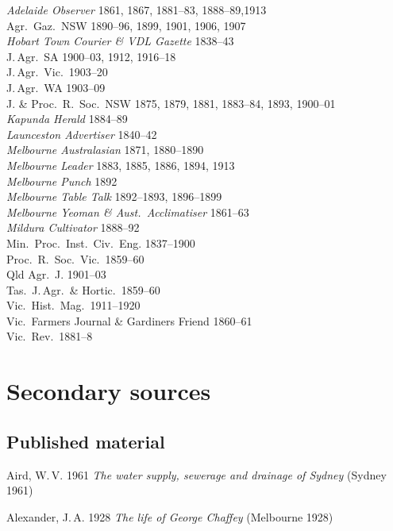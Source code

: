 \textsl{Adelaide Observer} 1861, 1867, 1881--83, 1888--89,1913\\
Agr.\ Gaz.\ NSW  1890--96, 1899, 1901, 1906, 1907\\
\textsl{Hobart Town Courier \& VDL Gazette} 1838--43\\ 
J.\,Agr.\ SA 1900--03, 1912, 1916--18\\
J.\,Agr.\ Vic.\ 1903--20\\
J.\,Agr.\ WA 1903--09\\
J. \& Proc.\ R.~Soc.\ NSW 1875, 1879, 1881, 1883--84, 1893, 1900--01\\
\textsl{Kapunda Herald} 1884--89\\
\textsl{Launceston Advertiser} 1840--42\\
\textsl{Melbourne Australasian} 1871, 1880--1890\\
\textsl{Melbourne Leader} 1883, 1885, 1886, 1894, 1913\\
\textsl{Melbourne Punch} 1892\\
\textsl{Melbourne Table Talk} 1892--1893, 1896--1899\\
\textsl{Melbourne Yeoman \& Aust.\ Acclimatiser} 1861--63\\
\textsl{Mildura Cultivator} 1888--92\\
Min.\ Proc.\ Inst.\ Civ.\ Eng. 1837--1900\\
Proc.\ R.~Soc.\ Vic.\ 1859--60\\
Qld Agr.\ J. 1901--03\\
Tas.\ J.\,Agr.\ \& Hortic.\  1859--60\\
Vic.\ Hist.\ Mag.\ 1911--1920\\
Vic.\ Farmers Journal \& Gardiners Friend 1860--61\\
Vic.\ Rev.\ 1881--8\\

\section*{Secondary sources}

\subsection*{Published material}

Aird, W.\,V. 1961 \textsl{The water supply, sewerage and drainage of
Sydney} (Sydney 1961)

Alexander, J.\,A.  1928 \textsl{The life of George Chaffey} (Melbourne
1928)

